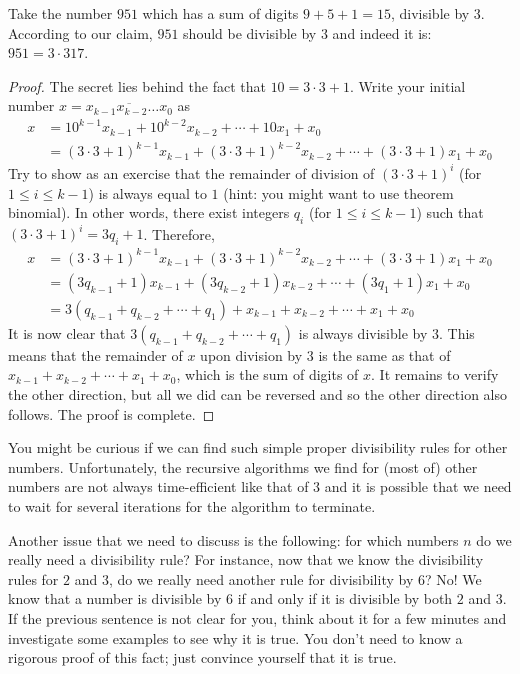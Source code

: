 \documentclass{subfile}
\begin{document}
	\begin{example}
		Take the number $951$ which has a sum of digits $9+5+1=15$, divisible by $3$. According to our claim, $951$ should be divisible by $3$ and indeed it is: $951=3\cdot317$.
	\end{example}

	\begin{proof}
		The secret lies behind the fact that $10 = 3 \cdot 3 + 1$. Write your initial number $x = \overline{x_{k-1} x_{k-2}\ldots x_0}$ as
			\begin{align*}
				x & = 10^{k-1}x_{k-1} + 10^{k-2}x_{k-2} + \cdots + 10x_1 + x_0\\
				&= (3 \cdot 3 + 1)^{k-1}x_{k-1} + (3 \cdot 3 + 1)^{k-2}x_{k-2} + \cdots + (3 \cdot 3 + 1)x_1 + x_0
			\end{align*}
		Try to show as an exercise that the remainder of division of $(3 \cdot 3 + 1)^{i}$ (for $1 \leq i \leq k-1$) is always equal to $1$ (hint: you might want to use theorem \gls{binomial}). In other words, there exist integers $q_i$ (for $1 \leq i \leq k-1$) such that $(3 \cdot 3 + 1)^{i} = 3q_i + 1$. Therefore,
			\begin{align*}
				x &= (3 \cdot 3 + 1)^{k-1}x_{k-1} + (3 \cdot 3 + 1)^{k-2}x_{k-2} + \cdots + (3 \cdot 3 + 1)x_1 + x_0\\
				&= (3q_{k-1}+1)x_{k-1} + (3q_{k-2}+1)x_{k-2} + \cdots  + (3q_{1}+1)x_{1} + x_{0}\\
				&= 3(q_{k-1} + q_{k-2} + \cdots + q_1)  + x_{k-1} + x_{k-2} + \cdots + x_1 + x_0
			\end{align*}
		It is now clear that $3(q_{k-1} + q_{k-2} + \cdots + q_1)$ is always divisible by $3$. This means that the remainder of $x$ upon division by $3$ is the same as that of $x_{k-1} + x_{k-2} + \cdots + x_1 + x_0$, which is the sum of digits of $x$. It remains to verify the other direction, but all we did can be reversed and so the other direction also follows. The proof is complete.
	\end{proof}

You might be curious if we can find such simple proper divisibility rules for other numbers. Unfortunately, the recursive algorithms we find for (most of) other numbers are not always time-efficient like that of $3$ and it is possible that we need to wait for several iterations for the algorithm to terminate.

Another issue that we need to discuss is the following: for which numbers $n$ do we really need a divisibility rule? For instance, now that we know the divisibility rules for $2$ and $3$, do we really need another rule for divisibility by $6$? No! We know that a number is divisible by $6$ if and only if it is divisible by both $2$ and $3$. If the previous sentence is not clear for you, think about it for a few minutes and investigate some examples to see why it is true. You don't need to know a rigorous proof of this fact; just convince yourself that it is true.
\end{document}
